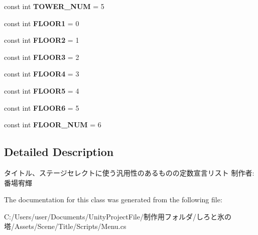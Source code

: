 \begin{DoxyCompactItemize}
const int {\bfseries T\+O\+W\+E\+R\+\_\+\+N\+UM} = 5
\item 
\mbox{\label{class_menu_a0622362b919e890f0583c7c9e7cc0274}} 
const int {\bfseries F\+L\+O\+O\+R1} = 0
\item 
\mbox{\label{class_menu_a8a3f9b2c3d5294c90f84bb1cf8a2e182}} 
const int {\bfseries F\+L\+O\+O\+R2} = 1
\item 
\mbox{\label{class_menu_a6139b4665288a4d97e32ad72661c74eb}} 
const int {\bfseries F\+L\+O\+O\+R3} = 2
\item 
\mbox{\label{class_menu_aefbc838a7a9d42af67d7a5d2029e2859}} 
const int {\bfseries F\+L\+O\+O\+R4} = 3
\item 
\mbox{\label{class_menu_ae908616ba945e610494004dbcaa5466c}} 
const int {\bfseries F\+L\+O\+O\+R5} = 4
\item 
\mbox{\label{class_menu_a3f49fa3185d32c2e9914ac63c6771a3b}} 
const int {\bfseries F\+L\+O\+O\+R6} = 5
\item 
\mbox{\label{class_menu_ad682801541015d7a6e5a6d1719283e62}} 
const int {\bfseries F\+L\+O\+O\+R\+\_\+\+N\+UM} = 6
\end{DoxyCompactItemize}


\subsection{Detailed Description}
タイトル、ステージセレクトに使う汎用性のあるものの定数宣言リスト 制作者\+:番場宥輝 



The documentation for this class was generated from the following file\+:\begin{DoxyCompactItemize}
\item 
C\+:/\+Users/user/\+Documents/\+Unity\+Project\+File/制作用フォルダ/しろと氷の塔/\+Assets/\+Scene/\+Title/\+Scripts/Menu.\+cs\end{DoxyCompactItemize}
